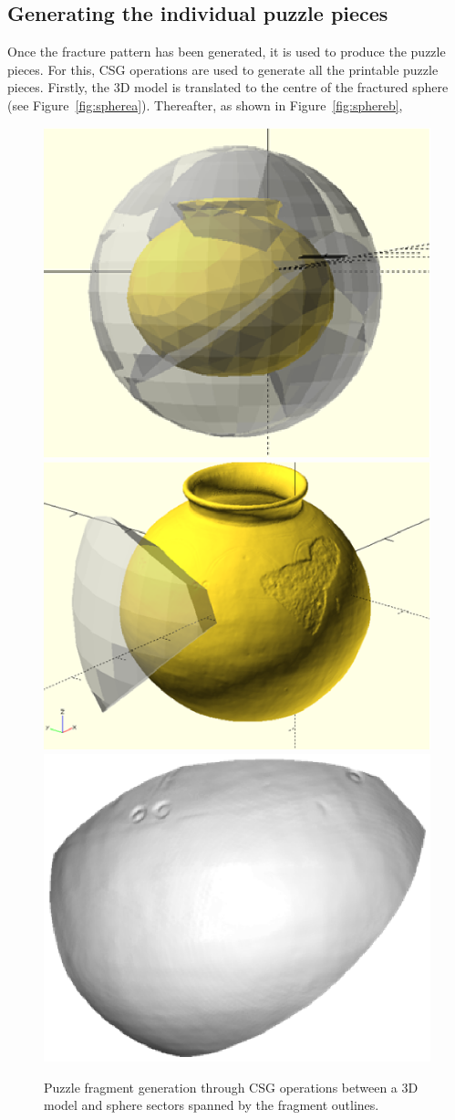 \documentclass[acmlarge,screen,dvipsnames]{acmart}
\begin{document}


\subsection{Generating the individual puzzle pieces}
\label{sec:fragment-generation}

Once the fracture pattern has been generated, it is used to produce
the puzzle pieces. For this, CSG operations are used to generate all
the printable puzzle pieces. Firstly, the 3D model is translated to
the centre of the fractured sphere (see
Figure~\ref{fig:spherea}). Thereafter, as shown in
Figure~\ref{fig:sphereb},
%
\begin{figure}[htb]
  \centering
  {\includegraphics[width=0.30\linewidth]{images/sphere}}
  \hspace{0.2in}
   {\includegraphics[width=0.30\linewidth]{images/intersection}}
   \hspace{0.2in}
  {\includegraphics[width=0.30\linewidth]{images/puzzlepiece}}%
  \caption{Puzzle fragment generation through CSG operations between a 3D model and sphere sectors spanned by the fragment outlines.}
\end{figure}
\end{document}
